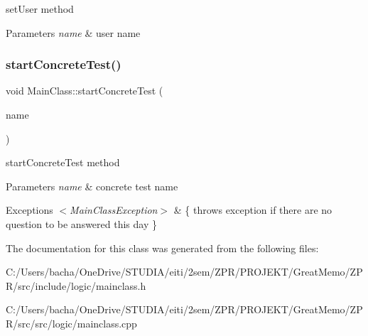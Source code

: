 set\+User method 


\begin{DoxyParams}{Parameters}
{\em name} & user name \\
\hline
\end{DoxyParams}
\mbox{\label{class_main_class_ac50731f2e84b87ea305679ac3a8a2ac7}} 
\subsubsection{\texorpdfstring{start\+Concrete\+Test()}{startConcreteTest()}}
{\footnotesize\ttfamily void Main\+Class\+::start\+Concrete\+Test (\begin{DoxyParamCaption}\item[{Q\+String}]{name }\end{DoxyParamCaption})}



start\+Concrete\+Test method 


\begin{DoxyParams}{Parameters}
{\em name} & concrete test name \\
\hline
\end{DoxyParams}

\begin{DoxyExceptions}{Exceptions}
{\em $<$\+Main\+Class\+Exception$>$} & \{ throws exception if there are no question to be answered this day \} \\
\hline
\end{DoxyExceptions}


The documentation for this class was generated from the following files\+:\begin{DoxyCompactItemize}
\item 
C\+:/\+Users/bacha/\+One\+Drive/\+S\+T\+U\+D\+I\+A/eiti/2sem/\+Z\+P\+R/\+P\+R\+O\+J\+E\+K\+T/\+Great\+Memo/\+Z\+P\+R/src/include/logic/mainclass.\+h\item 
C\+:/\+Users/bacha/\+One\+Drive/\+S\+T\+U\+D\+I\+A/eiti/2sem/\+Z\+P\+R/\+P\+R\+O\+J\+E\+K\+T/\+Great\+Memo/\+Z\+P\+R/src/src/logic/mainclass.\+cpp\end{DoxyCompactItemize}
